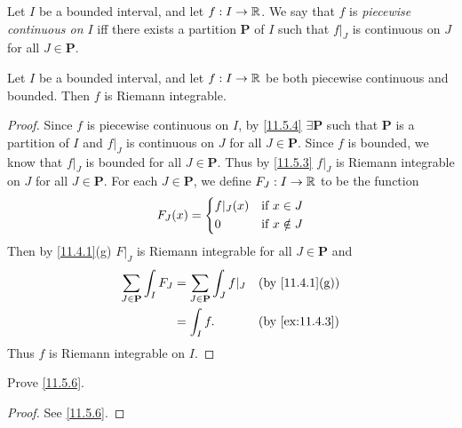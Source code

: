 \begin{defn}\label{11.5.4}
  Let \(I\) be a bounded interval, and let \(f : I \to \mathbb{R}\).
  We say that \(f\) is \emph{piecewise continuous on \(I\)} iff there exists a partition \(\mathbf{P}\) of \(I\) such that \(f|_J\) is continuous on \(J\) for all \(J \in \mathbf{P}\).
\end{defn}

\setcounter{thm}{5}
\begin{prop}\label{11.5.6}
  Let \(I\) be a bounded interval, and let \(f : I \to \mathbb{R}\) be both piecewise continuous and bounded.
  Then \(f\) is Riemann integrable.
\end{prop}

\begin{proof}
  Since \(f\) is piecewise continuous on \(I\), by \cref{11.5.4} \(\exists \mathbf{P}\) such that \(\mathbf{P}\) is a partition of \(I\) and \(f|_J\) is continuous on \(J\) for all \(J \in \mathbf{P}\).
  Since \(f\) is bounded, we know that \(f|_J\) is bounded for all \(J \in \mathbf{P}\).
  Thus by \cref{11.5.3} \(f|_J\) is Riemann integrable on \(J\) for all \(J \in \mathbf{P}\).
  For each \(J \in \mathbf{P}\), we define \(F_J : I \to \mathbb{R}\) to be the function
  \[
    F_J(x) = \begin{dcases}
      f|_J(x) & \text{if } x \in J    \\
      0       & \text{if } x \notin J
    \end{dcases}
  \]
  Then by \cref{11.4.1}(g) \(F|_J\) is Riemann integrable for all \(J \in \mathbf{P}\) and
  \begin{align*}
    \sum_{J \in \mathbf{P}} \int_I F_J & = \sum_{J \in \mathbf{P}} \int_J f|_J &  & \text{(by \cref{11.4.1}(g))} \\
                                       & = \int_I f.                           &  & \by{ex:11.4.3}
  \end{align*}
  Thus \(f\) is Riemann integrable on \(I\).
\end{proof}

\exercisesection

\begin{ex}\label{ex:11.5.1}
  Prove \cref{11.5.6}.
\end{ex}

\begin{proof}
  See \cref{11.5.6}.
\end{proof}